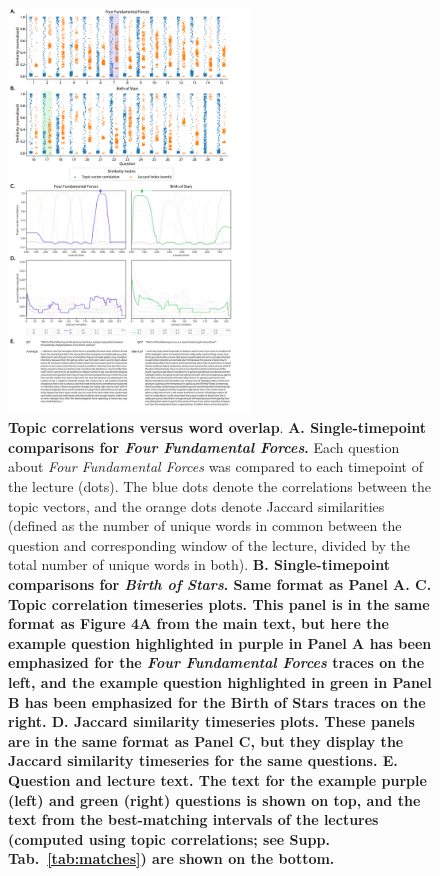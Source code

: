 \documentclass[10pt]{article}
\begin{document}
\begin{figure}[tp]
    \centering
    \includegraphics[width=0.57\textwidth]{figs/word-overlap-comparison}

    \caption{\textbf{Topic correlations versus word overlap}. \textbf{A.
    Single-timepoint comparisons for \textit{Four Fundamental Forces}.} Each
    question about \textit{Four Fundamental Forces} was compared to each
    timepoint of the lecture (dots). The blue dots denote the correlations
    between the topic vectors, and the orange dots denote Jaccard similarities
    (defined as the number of unique words in common between the question and
    corresponding window of the lecture, divided by the total number of unique
    words in both). \textbf{B. Single-timepoint comparisons for \textit{Birth
    of Stars}. Same format as Panel A. \textbf{C. Topic correlation timeseries
    plots.} This panel is in the same format as Figure 4A from the main text,
    but here the example question highlighted in purple in Panel A has been
    emphasized for the \textit{Four Fundamental Forces} traces on the left, and
    the example question highlighted in green in Panel B has been emphasized
    for the \textbf{Birth of Stars} traces on the right. \textbf{D. Jaccard
    similarity timeseries plots.} These panels are in the same format as Panel
    C, but they display the Jaccard similarity timeseries for the same
    questions. \textbf{E. Question and lecture text.} The text for the example
    purple (left) and green (right) questions is shown on top, and the text
    from the best-matching intervals of the lectures (computed using topic
    correlations; see Supp. Tab.~\ref{tab:matches}) are shown on the bottom.}}



    \label{fig:compare-wordcount}
\end{figure}
\end{document}
